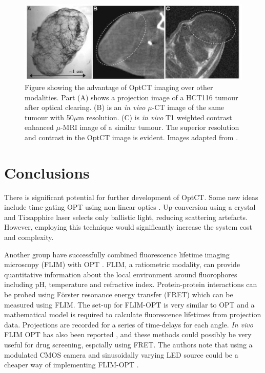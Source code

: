 \begin{figure}[H]
\centering
\includegraphics[scale=1]{Oldham_2006_tumourstaining.jpg}
\caption{Figure showing the advantage of OptCT imaging over other modalities. Part (A) shows a projection image of a HCT116 tumour after optical clearing. (B) is an \textit{in vivo} $\mu$-CT image of the same tumour with 50$\mu$m resolution. (C) is \textit{in vivo} T1 weighted contrast enhanced $\mu$-MRI image of a similar tumour. The superior resolution and contrast in the OptCT image is evident. Images  adapted from \cite{Oldham:2006}.}
\label{fig:tumourstaining}
\end{figure}





\newpage
\section{Conclusions}

There is significant potential for further development of OptCT. Some new ideas include time-gating OPT using non-linear optics \cite{Bassi:2010}. Up-conversion using a crystal and Ti:sapphire laser  selects only ballistic light,  reducing scattering artefacts. However, employing this technique would significantly increase the system cost and complexity.

Another group have successfully combined fluorescence lifetime imaging microscopy (FLIM) 
with OPT \cite{McGinty:2008ix}. FLIM, a ratiometric modality, can provide quantitative information about the local environment around fluorophores including pH, temperature and refractive index. Protein-protein interactions can be probed using F\"{o}rster  resonance energy transfer (FRET) which can be measured using FLIM.  The set-up for FLIM-OPT is very similar to OPT and  a mathematical model is required to calculate fluorescence lifetimes from projection data. Projections are recorded for a series of time-delays for each angle. \textit{In vivo} FLIM OPT has also been reported \cite{McGinty:2011vm}, and these methods could possibly be very useful for drug screening, espcially using FRET. The authors note that using a modulated CMOS camera and sinusoidally varying LED source could be a cheaper way of implementing FLIM-OPT \cite{McGinty:2011vm}.

